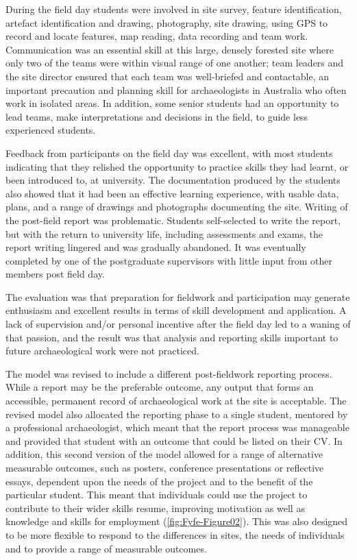 \documentclass{ijsra}
\begin{document}
During the field day students were involved in site survey, feature identification, artefact identification and drawing, photography, site drawing, using GPS to record and locate features, map reading, data recording and team work. 
Communication was an essential skill at this large, densely forested site where only two of the teams were within visual range of one another; team leaders and the site director ensured that each team was well-briefed and contactable, an important precaution and planning skill for archaeologists in Australia who often work in isolated areas. 
In addition, some senior students had an opportunity to lead teams, make interpretations and decisions in the field, to guide less experienced students.


Feedback from participants on the field day was excellent, with most students indicating that they relished the opportunity to practice skills they had learnt, or been introduced to, at university. 
The documentation produced by the students also showed that it had been an effective learning experience, with usable data, plans, and a range of drawings and photographs documenting the site. 
Writing of the post-field report was problematic. Students self-selected to write the report, but with the return to university life, including assessments and exams, the report writing lingered and was gradually abandoned. It was eventually completed by one of the postgraduate supervisors with little input from other members post field day.

The evaluation was that preparation for fieldwork and participation may generate enthusiasm and excellent results in terms of skill development and application. 
A lack of supervision and/or personal incentive after the field day led to a waning of that passion, and the result was that analysis and reporting skills important to future archaeological work were not practiced.

The model was revised to include a different post-fieldwork reporting process. While a report may be the preferable outcome, any output that forms an accessible, permanent record of archaeological work at the site is acceptable. 
The revised model also allocated the reporting phase to a single student, mentored by a professional archaeologist, which meant that the report process was manageable and provided that student with an outcome that could be listed on their CV. 
In addition, this second version of the model allowed for a range of alternative measurable outcomes, such as posters, conference presentations or reflective essays, dependent upon the needs of the project and to the benefit of the particular student. 
This meant that individuals could use the project to contribute to their wider skills resume, improving motivation as well as knowledge and skills for employment (\cref{fig:Fyfe-Figure02}). This was also designed to be more flexible to respond to the differences in sites, the needs of individuals and to provide a range of measurable outcomes.
\end{document}
